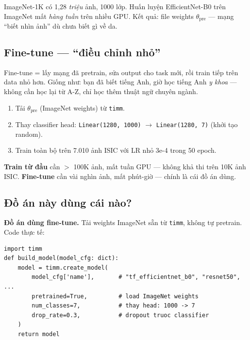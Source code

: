 \documentclass[11pt,a4paper]{article}
\begin{document}
\begin{example}
ImageNet-1K có 1,28 \textit{triệu} ảnh, 1000 lớp. Huấn luyện EfficientNet-B0 trên ImageNet mất \textit{hàng tuần} trên nhiều GPU. Kết quả: file weights $\theta_{\text{pre}}$ --- mạng ``biết nhìn ảnh'' dù chưa biết gì về da.
\end{example}

\subsection{Fine-tune --- ``điều chỉnh nhỏ''}

\begin{simple}
Fine-tune = lấy mạng đã pretrain, sửa output cho task mới, rồi train tiếp trên data nhỏ hơn. Giống như: bạn đã biết tiếng Anh, giờ học tiếng Anh \textit{y khoa} --- không cần học lại từ A-Z, chỉ học thêm thuật ngữ chuyên ngành.
\end{simple}

\begin{example}
\begin{enumerate}[leftmargin=*]
  \item Tải $\theta_{\text{pre}}$ (ImageNet weights) từ \texttt{timm}.
  \item Thay classifier head: \texttt{Linear(1280, 1000)} $\to$ \texttt{Linear(1280, 7)} (khởi tạo random).
  \item Train toàn bộ trên 7.010 ảnh ISIC với LR nhỏ 3e-4 trong 50 epoch.
\end{enumerate}
\end{example}

\begin{idea}
\textbf{Train từ đầu} cần $>$ 100K ảnh, mất tuần GPU --- không khả thi trên 10K ảnh ISIC.
\textbf{Fine-tune} cần vài nghìn ảnh, mất phút-giờ --- chính là cái đồ án dùng.
\end{idea}

\subsection{Đồ án này dùng cái nào?}

\textbf{Đồ án dùng fine-tune.} Tải weights ImageNet sẵn từ \texttt{timm}, không tự pretrain. Code thực tế:

\begin{lstlisting}[caption={\texttt{src/models/build\_model.py}}]
import timm
def build_model(model_cfg: dict):
    model = timm.create_model(
        model_cfg['name'],       # "tf_efficientnet_b0", "resnet50", ...
        pretrained=True,         # load ImageNet weights
        num_classes=7,           # thay head: 1000 -> 7
        drop_rate=0.3,           # dropout truoc classifier
    )
    return model
\end{lstlisting}
\end{document}
